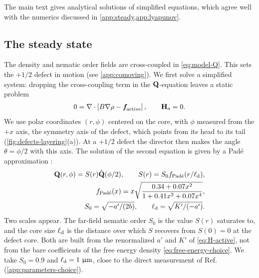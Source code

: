 \documentclass[aps,pre,reprint,superscriptaddress,longbibliography,nofootinbib
]{revtex4-2}
\begin{document}
The main text gives analytical solutions of simplified
equations, which agree well with the numerics discussed in
\cref{app:steady,app:lyapunov}.

\subsection{The steady state}
\label{sec:defect-steady}
The density and nematic order fields are cross-coupled in
\cref{eq:model-Q}. This sets the $+1/2$ defect in motion
(see \cref{app:comoving}). We first solve a simplified
system: dropping the cross-coupling term in the
$\mathbf{Q}$-equation leaves a static problem
\begin{align}
  \label{eq:simplified-noiseless}
  0 = \nabla\cdot\left[B\nabla\rho - \boldsymbol{f}_\text{\!active}\right] , \qquad \mathbf{H}_\text{a} = 0.
\end{align}
We use polar coordinates $(r,\phi)$ centered on the core,
with $\phi$ measured from the $+x$ axis, the symmetry axis
of the defect, which points from its head to its tail
(\cref{fig:defects-layering}(a)). At a $+1/2$ defect the
director then makes the angle $\theta=\phi/2$ with this
axis. The solution of the second equation is given by a
Pad\'{e} approximation
\cite{pismen1999vortices,pismen2006patterns}:
\begin{align}
  \mathbf{Q}(r,\phi) = S(r)\hat{\mathbf{Q}}(\phi/2),
  \qquad
  S(r) = S_0 f_{\text{Pad\'{e}}}(r/\ell_{\rm d}),
  \label{eq:Q-pade}\\
  \label{eq:pade-approximation}
  f_{\text{Pad\'{e}}}(x) = x \sqrt{\frac{0.34 + 0.07 x^2}{1 + 0.41 x^2+0.07 x^4}},
  \\
  S_0=\sqrt{-a'/(2b)}, \qquad \ell_{\rm d}=\sqrt{K'/(-a')}.
  \label{eq:S0-elld}
\end{align}
Two scales appear. The far-field nematic order $S_0$ is the
value $S(r)$ saturates to, and the core size $\ell_{\rm d}$ is the
distance over which $S$ recovers from $S(0)=0$ at the
defect core. Both are built from the renormalized $a'$ and
$K'$ of \cref{eq:H-active}, not from the bare coefficients
of the free energy density \eqref{eq:free-energy-choice}.
We take $S_0=0.9$ and $\ell_{\rm d}=1~\upmu\mathrm{m}$, close to the
direct measurement of Ref.~\cite{han2025local}
(\cref{app:parameters-choice}).
\end{document}

